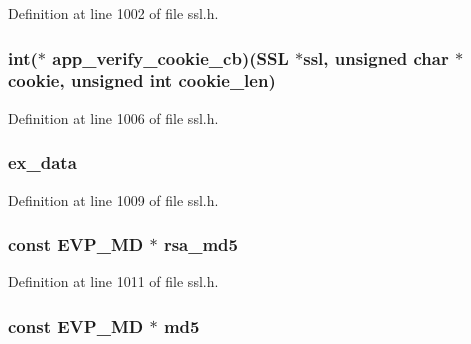 Definition at line 1002 of file ssl.\+h.

\subsubsection[{\texorpdfstring{app\+\_\+verify\+\_\+cookie\+\_\+cb}{app_verify_cookie_cb}}]{\setlength{\rightskip}{0pt plus 5cm}int($\ast$ app\+\_\+verify\+\_\+cookie\+\_\+cb)({\bf S\+SL} $\ast$ssl, unsigned char $\ast$cookie, unsigned int cookie\+\_\+len)}\hypertarget{structssl__ctx__st_a42484c1fffceb0dc184fd2ab9e78b569}{}\label{structssl__ctx__st_a42484c1fffceb0dc184fd2ab9e78b569}


Definition at line 1006 of file ssl.\+h.

\subsubsection[{\texorpdfstring{ex\+\_\+data}{ex_data}}]{ ex\+\_\+data}\hypertarget{structssl__ctx__st_ac3e4fd59d6ee44a81f3a58114613c1e2}{}\label{structssl__ctx__st_ac3e4fd59d6ee44a81f3a58114613c1e2}


Definition at line 1009 of file ssl.\+h.

\subsubsection[{\texorpdfstring{rsa\+\_\+md5}{rsa_md5}}]{\setlength{\rightskip}{0pt plus 5cm}const {\bf E\+V\+P\+\_\+\+MD} $\ast$ rsa\+\_\+md5}\hypertarget{structssl__ctx__st_abe46b04e770ef2fba44e4274f908f063}{}\label{structssl__ctx__st_abe46b04e770ef2fba44e4274f908f063}


Definition at line 1011 of file ssl.\+h.

\subsubsection[{\texorpdfstring{md5}{md5}}]{\setlength{\rightskip}{0pt plus 5cm}const {\bf E\+V\+P\+\_\+\+MD} $\ast$ md5}\hypertarget{structssl__ctx__st_aa13149226ebb5fc47793360257077e62}{}\label{structssl__ctx__st_aa13149226ebb5fc47793360257077e62}



